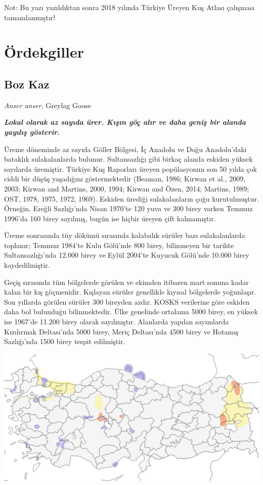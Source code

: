 \documentclass[
  a4paper,
  DIV=11,
  numbers=noendperiod]{scrartcl}
\begin{document}
Not: Bu yazı yazıldıktan sonra 2018 yılında Türkiye Üreyen Kuş Atlası
çalışması tamamlanmıştır!


\chapter{Ördekgiller}\label{uxf6rdekgiller}

\section{Boz Kaz}\label{boz-kaz}

\emph{Anser anser}, Greylag Goose

\textbf{\emph{Lokal olarak az sayıda ürer. Kışın göç alır ve daha geniş
bir alanda yayılış gösterir.}}

Üreme döneminde az sayıda Göller Bölgesi, İç Anadolu ve Doğu
Anadolu'daki bataklık sulakalanlarda bulunur. Sultansazlığı gibi birkaç
alanda eskiden yüksek sayılarda üremiştir. Türkiye Kuş Raporları üreyen
popülasyonun son 50 yılda çok ciddi bir düşüş yaşadığını göstermektedir
(Beaman, 1986; Kirwan et al., 2009, 2003; Kirwan and Martins, 2000,
1994; Kirwan and Özen, 2014; Martins, 1989; OST, 1978, 1975, 1972,
1969). Eskiden ürediği sulakalanların çoğu kurutulmuştur. Örneğin,
Ereğli Sazlığı'nda Nisan 1970'te 120 yuva ve 300 birey varken Temmuz
1996'da 160 birey sayılmış, bugün ise hiçbir üreyen çift kalmamıştır.

Üreme sonrasında tüy dökümü sırasında kalabalık sürüler bazı
sulakalanlarda toplanır; Temmuz 1984'te Kulu Gölü'nde 800 birey,
bilinmeyen bir tarihte Sultansazlığı'nda 12.000 birey ve Eylül 2004'te
Kuyucuk Gölü'nde 10.000 birey kaydedilmiştir.

Geçiş sırasında tüm bölgelerde görülen ve ekimden itibaren mart sonuna
kadar kalan bir kış göçmenidir. Kışlayan sürüler genellikle kıyısal
bölgelerde yoğunlaşır. Son yıllarda görülen sürüler 300 bireyden azdır.
KOSKS verilerine göre eskiden daha bol bulunduğu bilinmektedir. Ülke
genelinde ortalama 5000 birey, en yüksek ise 1967'de 11.200 birey olarak
sayılmıştır. Alanlarda yapılan sayımlarda Kızılırmak Deltası'nda 5000
birey, Meriç Deltası'nda 4500 birey ve Hotamış Sazlığı'nda 1500 birey
tespit edilmiştir.

\includegraphics{images/harita_Anser anser.png}
\end{document}
